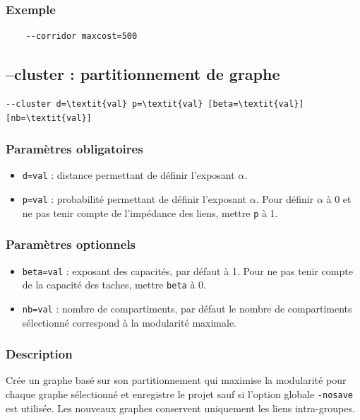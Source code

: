 \documentclass[a4paper,10pt]{report}
\begin{document}
\subsubsection{Exemple}
\begin{Verbatim}
	--corridor maxcost=500
\end{Verbatim}

\subsection{--cluster : partitionnement de graphe}
\begin{Verbatim}[commandchars=\\\{\}]
--cluster d=\textit{val} p=\textit{val} [beta=\textit{val}] [nb=\textit{val}]
\end{Verbatim}

\subsubsection{Paramètres obligatoires}
\begin{itemize}
	\item \verb|d=val| : distance permettant de définir l'exposant $\alpha$.
	\item \verb|p=val| : probabilité permettant de définir l'exposant $\alpha$. Pour définir $\alpha$ à 0 et ne pas tenir compte de l'impédance des liens, mettre \verb|p| à 1.
\end{itemize}

\subsubsection{Paramètres optionnels}
\begin{itemize}
	\item \verb|beta=val| : exposant des capacités, par défaut à 1. Pour ne pas tenir compte de la capacité des taches, mettre \verb|beta| à 0.
	\item \verb|nb=val| : nombre de compartiments, par défaut le nombre de compartiments sélectionné correspond à la modularité maximale.
\end{itemize}

\subsubsection{Description}
Crée un graphe basé sur son partitionnement qui maximise la modularité \cite{Newman2006} pour chaque graphe sélectionné et enregistre le projet sauf si l'option globale \verb|-nosave| est utilisée.
Les nouveaux graphes conservent uniquement les liens intra-groupes.
\end{document}
